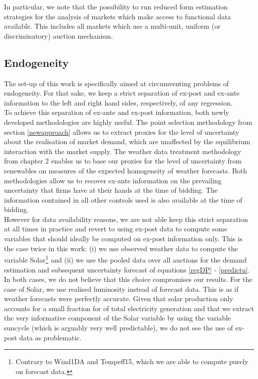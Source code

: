 In particular, we note that the possibility to run reduced form estimation strategies for the analysis of markets which make access to functional data available. This includes all markets which use a multi-unit, uniform (or discriminatory) auction mechanism. \\


\subsection{Endogeneity}
\label{endogeneityconcern}
The set-up of this work is specifically aimed at  circumventing problems of endogeneity. For that sake, we keep a strict separation of ex-post and ex-ante information to the left and right hand sides, respectively, of any regression. \\

To achieve this separation of ex-ante and ex-post information, both newly developed methodologies are highly useful. The point selection methodology from section \ref{newapproach} allows us to extract proxies for the level of uncertainty about the realisation of market demand, which are unaffected by the equilibrium interaction with the market supply.
The weather data treatment methodology from chapter 2 enables us to base our proxies for the level of uncertainty from renewables on measures of the expected homogeneity of weather forecasts. 
Both methodologies allow us to recover ex-ante information on the prevailing uncertainty that firms have at their hands at the time of bidding. The information contained in all other controls used is also available at the time of bidding. \\

However for data availability reasons, we are not able keep this strict separation at all times in practice and revert to using ex-post data to compute some variables that should ideally be computed on ex-post information only. This is the case twice in this work: (i) we use observed weather data to compute the variable Solar\footnote{Contrary to Wind1DA and Tempeff15, which we are able to compute purely on forecast data.} and (ii) we use the pooled data over all auctions for the demand estimation and subsequent uncertainty forecast of equations \ref{regDP} - \ref{predictu}.\\ 

In both cases, we do not believe that this choice compromises our results.
For the case of Solar, we use realised luminosity instead of forecast data. This is as if weather forecasts were perfectly accurate. 
Given that solar production only accounts for a small fraction for of total electricity generation and that we extract the very informative component of the Solar variable by using the variable suncycle (which is arguably very well predictable), we do not see the use of ex-post data as problematic. \\

